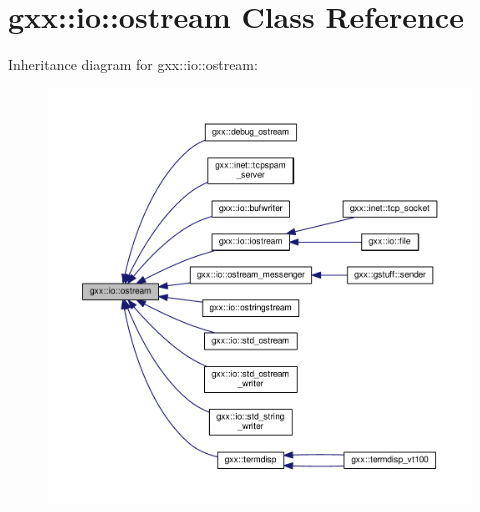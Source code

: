 \hypertarget{classgxx_1_1io_1_1ostream}{}\section{gxx\+:\+:io\+:\+:ostream Class Reference}
\label{classgxx_1_1io_1_1ostream}


Inheritance diagram for gxx\+:\+:io\+:\+:ostream\+:
\nopagebreak
\begin{figure}[H]
\begin{center}
\leavevmode
\includegraphics[width=350pt]{classgxx_1_1io_1_1ostream__inherit__graph}
\end{center}
\end{figure}
